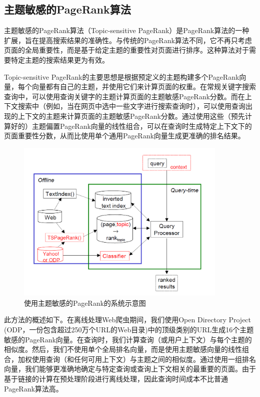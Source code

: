 \documentclass[UTF8,openany]{ctexbook}
\begin{document}
\subsection[主题敏感的PageRank算法]{主题敏感的PageRank算法}

主题敏感的PageRank算法（Topic-sensitive PageRank）是PageRank算法的一种扩展，旨在提高搜索结果的准确性。与传统的PageRank算法不同，它不再只考虑页面的全局重要性，而是基于给定主题的重要性对页面进行排序。这种算法对于需要特定主题的搜索结果更为有效。

Topic-sensitive PageRank的主要思想是根据预定义的主题构建多个PageRank向量，每个向量都有自己的主题，并使用它们来计算页面的权重。在常规关键字搜索查询中，可以使用查询关键字的主题计算页面的主题敏感PageRank分数。而在上下文搜索中（例如，当在网页中选中一些文字进行搜索查询时），可以使用查询出现的上下文的主题来计算页面的主题敏感PageRank分数。通过使用这些（预先计算好的）主题偏置PageRank向量的线性组合，可以在查询时生成特定上下文下的页面重要性分数，从而比使用单个通用PageRank向量生成更准确的排名结果。\cite{bi:TC}

\begin{figure}[H]
    \begin{center}
        \includegraphics[width=0.9\textwidth]{./images/topic_sensitive.png}
        \caption{使用主题敏感的PageRank的系统示意图\cite{bi:TC}}
    \end{center}
\end{figure}

此方法的概述如下\cite{bi:TC}。在离线处理Web爬虫期间，我们使用Open Directory Project (ODP，一份包含超过250万个URL的Web目录)中的顶级类别的URL生成16个主题敏感的PageRank向量。在查询时，我们计算查询（或用户上下文）与每个主题的相似度。然后，我们不使用单个全局排名向量，而是使用主题敏感向量的线性组合，加权使用查询（和任何可用上下文）与主题之间的相似度。通过使用一组排名向量，我们能够更准确地确定与特定查询或查询上下文相关的最重要的页面。由于基于链接的计算在预处理阶段进行离线处理，因此查询时间成本不比普通PageRank算法高。
\end{document}
